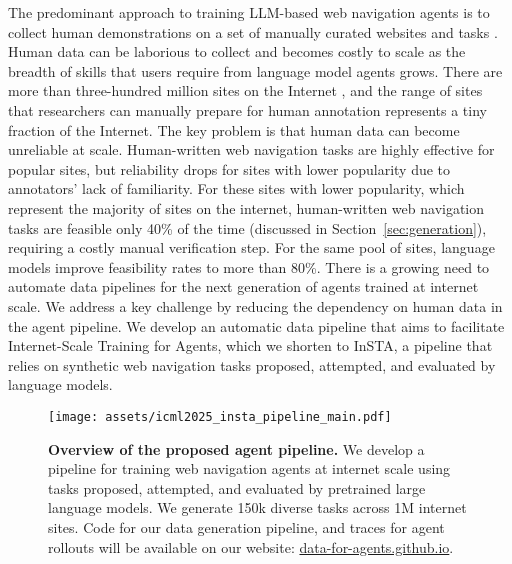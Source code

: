 The predominant approach to training LLM-based web navigation agents is to collect human demonstrations on a set of manually curated websites and tasks \citep{Mind2Web,WebArena,AgentQ,VisualWebArena,VisualWebBench,WebLINX,AndroidInTheWild}. Human data can be laborious to collect and becomes costly to scale as the breadth of skills that users require from language model agents grows. There are more than three-hundred million sites on the Internet \citep{CommonCrawl}, and the range of sites that researchers can manually prepare for human annotation represents a tiny fraction of the Internet. The key problem is that human data can become unreliable at scale. Human-written web navigation tasks are highly effective for popular sites, but reliability drops for sites with lower popularity due to annotators' lack of familiarity. For these sites with lower popularity, which represent the majority of sites on the internet, human-written web navigation tasks are feasible only 40\% of the time (discussed in Section~\ref{sec:generation}), requiring a costly manual verification step. For the same pool of sites, language models improve feasibility rates to more than 80\%.
There is a growing need to automate data pipelines for the next generation of agents trained at internet scale. We address a key challenge by reducing the dependency on human data in the agent pipeline.
We develop an automatic data pipeline that aims to facilitate Internet-Scale Training for Agents, which we shorten to InSTA, a pipeline that relies on synthetic web navigation tasks proposed, attempted, and evaluated by language models.

\begin{figure*}
    \centering
    \texttt{[image: assets/icml2025\_insta\_pipeline\_main.pdf]}
    \vspace{-0.3cm}
    \caption{\small \textbf{Overview of the proposed agent pipeline.} We develop a pipeline for training web navigation agents at internet scale using tasks proposed, attempted, and evaluated by pretrained large language models. We generate 150k diverse tasks across 1M internet sites. Code for our data generation pipeline, and traces for agent rollouts will be available on our website: \href{https://data-for-agents.github.io}{data-for-agents.github.io}.}
    \vspace{-0.3cm}
    \label{fig:pipeline-main}
\end{figure*}

